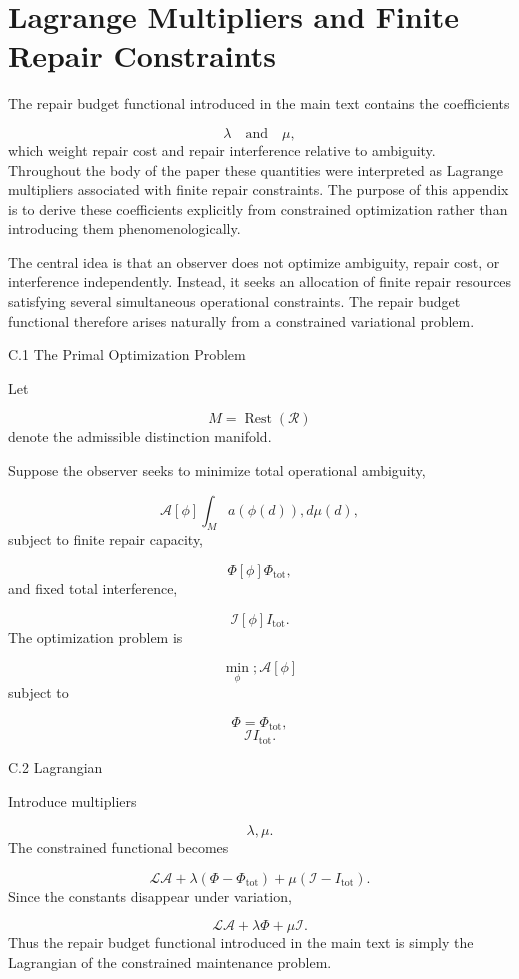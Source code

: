 \documentclass[12pt,oneside]{article}
\theoremstyle{plain}
\theoremstyle{definition}
\theoremstyle{remark}
\DeclareMathOperator{\Rest}{Rest}
\begin{document}
\section{Lagrange Multipliers and Finite Repair Constraints}

The repair budget functional introduced in the main text contains the coefficients

\[
\lambda
\quad\text{and}\quad
\mu,
\]
which weight repair cost and repair interference relative to ambiguity. Throughout the body of the paper these quantities were interpreted as Lagrange multipliers associated with finite repair constraints. The purpose of this appendix is to derive these coefficients explicitly from constrained optimization rather than introducing them phenomenologically.

The central idea is that an observer does not optimize ambiguity, repair cost, or interference independently. Instead, it seeks an allocation of finite repair resources satisfying several simultaneous operational constraints. The repair budget functional therefore arises naturally from a constrained variational problem.


C.1 The Primal Optimization Problem

Let

\[
M=\Rest(\mathcal R)
\]
denote the admissible distinction manifold.

Suppose the observer seeks to minimize total operational ambiguity,

\[
\mathcal A[\phi]
\int_M
a(\phi(d))
,d\mu(d),
\]
subject to finite repair capacity,

\[
\Phi[\phi]
\Phi_{\mathrm{tot}},
\]
and fixed total interference,

\[
\mathcal I[\phi]
I_{\mathrm{tot}}.
\]
The optimization problem is

\[
\min_{\phi}
;
\mathcal A[\phi]
\]
subject to

\[
\Phi=\Phi_{\mathrm{tot}},
\]
\[
\mathcal I
I_{\mathrm{tot}}.
\]

C.2 Lagrangian

Introduce multipliers

\[
\lambda,
\mu.
\]
The constrained functional becomes

\[
\mathcal L
\mathcal A
+
\lambda
\left(
\Phi-
\Phi_{\mathrm{tot}}
\right)
+
\mu
\left(
\mathcal I-
I_{\mathrm{tot}}
\right).
\]
Since the constants disappear under variation,

\[
\mathcal L
\mathcal A
+
\lambda\Phi
+
\mu\mathcal I.
\]
Thus the repair budget functional introduced in the main text is simply the Lagrangian of the constrained maintenance problem.
\end{document}
